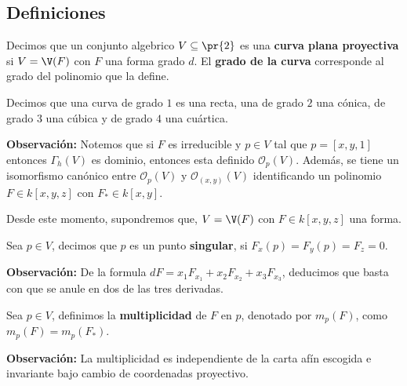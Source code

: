 \documentclass{article}
\begin{document}
\subsection{Definiciones}
\begin{dfn}
    Decimos que un conjunto algebrico $V\subseteq\pr{2}$ es una \textbf{curva plana proyectiva} si
    $V=\V(F)$ con $F$ una forma grado $d$. El \textbf{grado de la curva} corresponde al grado del 
    polinomio que la define.

    \vspace{2mm}
    \noindent Decimos que una curva de grado $1$ es una recta, una de grado $2$ una cónica, de 
    grado $3$ una cúbica y de grado $4$ una cuártica.
\end{dfn}
\noindent\textbf{Observación:} Notemos que si $F$ es irreducible y $p\in V$ tal que $p=[x,y,1]$ 
entonces $\Gamma_{h}(V)$ es dominio, entonces esta definido $\mathcal{O}_{p}(V)$. Además, se tiene 
un isomorfismo canónico entre $\mathcal{O}_{p}(V)$ y $\mathcal{O}_{(x,y)}(V)$ identificando un 
polinomio $F\in k[x,y,z]$ con $F_{*}\in k[x,y]$.

\vspace{2mm}
\noindent Desde este momento, supondremos que, $V=\V(F)$ con $F\in k[x,y,z]$ una forma.
\begin{dfn}
    Sea $p\in V$, decimos que $p$ es un punto \textbf{singular}, si $F_{x}(p)=F_{y}(p)=F_{z}=0$.
\end{dfn}
\noindent\textbf{Observación:} De la formula $dF=x_{1}F_{x_{1}}+x_{2}F_{x_{2}}+x_{3}F_{x_{3}}$, 
deducimos que basta con que se anule en dos de las tres derivadas.
\begin{dfn}
    Sea $p\in V$, definimos la \textbf{multiplicidad} de $F$ en $p$, denotado por $m_{p}(F)$, como 
    $m_{p}(F)=m_{p}(F_{*})$.
\end{dfn}
\noindent\textbf{Observación:} La multiplicidad es independiente de la carta afín escogida e 
invariante bajo cambio de coordenadas proyectivo.
\end{document}

